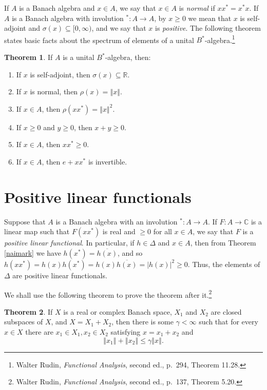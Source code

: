 \documentclass{article}
\newcommand{\norm}[1]{\left\Vert #1 \right\Vert}
\theoremstyle{definition}
\newtheorem{theorem}{Theorem}
\theoremstyle{definition}
\begin{document}
If $A$ is a Banach algebra and $x \in A$, we say that $x \in A$ is {\em normal} if $xx^*=x^*x$. If $A$ is a Banach algebra with involution $^*:A \to A$, 
by $x \geq 0$ we mean that $x$ is self-adjoint and $\sigma(x) \subseteq [0,\infty)$, and we say that $x$ is {\em positive}.
The following theorem states basic facts about the spectrum of elements of a unital $B^*$-algebra.\footnote{Walter Rudin, {\em Functional Analysis}, second ed., p.~294, Theorem 11.28.}

\begin{theorem}
If $A$ is a unital $B^*$-algebra, then:
\begin{enumerate}
\item If $x$ is self-adjoint, then $\sigma(x) \subseteq \mathbb{R}$.
\item If $x$ is normal, then $\rho(x)=\norm{x}$.
\item If $x \in A$, then $\rho(xx^*)=\norm{x}^2$.
\item If $x \geq 0$ and $y \geq 0$, then $x+y \geq 0$.
\item If $x \in A$, then $xx^* \geq 0$.
\item If $x \in A$, then $e+xx^*$ is invertible.
\end{enumerate}
\label{Balgebra}
\end{theorem}


\section{Positive linear functionals}
Suppose that $A$ is a Banach algebra with an involution $^*:A \to A$. If $F:A \to \mathbb{C}$ is a linear map such that $F(xx^*)$ is real and  $\geq 0$ for all $x \in A$,
we say that $F$ is a {\em positive linear functional}. In particular, if $h \in \Delta$ and $x \in A$, then from Theorem \ref{naimark} we have
$h(x^*)=\overline{h(x)}$, and so $h(xx^*)=h(x)h(x^*)=h(x)\overline{h(x)}=|h(x)|^2 \geq 0$. Thus, the elements of $\Delta$ are positive linear functionals.


We shall use the following theorem to prove the theorem after it.\footnote{Walter
Rudin, {\em Functional Analysis}, second ed., p.~137, Theorem 5.20.}

\begin{theorem}
If $X$ is a real or complex Banach space, $X_1$ and $X_2$ are closed subspaces of $X$, and $X=X_1+X_2$, then there is some
$\gamma<\infty$ such that for every $x \in X$ there are $x_1 \in X_1, x_2 \in X_2$ satisfying $x=x_1+x_2$ and
\[
\norm{x_1}+\norm{x_2} \leq \gamma\norm{x}.
\]
\label{520}
\end{theorem}
\end{document}
